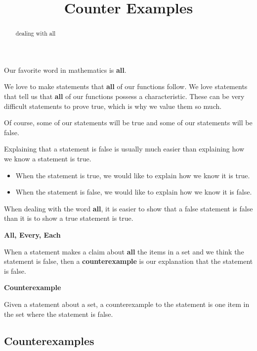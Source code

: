 \documentclass{ximera}
\title{Counter Examples}
\begin{document}
\begin{abstract}
dealing with all
\end{abstract}
\maketitle




Our favorite word in mathematics is \textbf{\textcolor{red!70!black}{all}}. 


We love to make statements that \textbf{all} of our functions follow. We love statements that tell us that \textbf{all} of our functions possess a characteristic. These can be very difficult statements to prove true, which is why we value them so much. 


Of course, some of our statements will be true and some of our statements will be false.

Explaining that a statement is false is usually much easier than explaining how we know a statement is true.


\begin{itemize}
\item When the statement is true, we would like to explain how we know it is true.
\item When the statement is false, we would like to explain how we know it is false.
\end{itemize}



When dealing with the word \textbf{all}, it is easier to show that a false statement is false than it is to show a true statement is true. 


\textbf{\textcolor{blue!55!black}{All, Every, Each}} 

When a statement makes a claim about \textbf{\textcolor{red!70!black}{all}} the items in a set and we think the statement is false, then a \textbf{counterexample} is our explanation that the statement is false.



\begin{definition}  \textbf{\textcolor{green!50!black}{Counterexample}} 

Given a statement about a set, a counterexample to the statement is one item in the set where the statement is false.

\end{definition}




\subsection*{Counterexamples}
\end{document}

